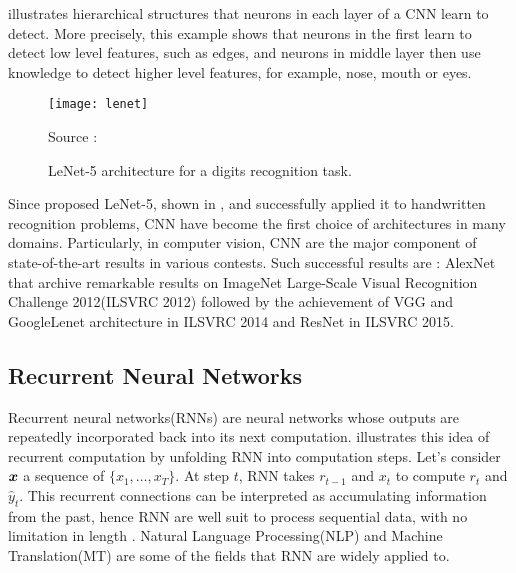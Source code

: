 \addfigure{\ref{fig:conv_intuition}} illustrates hierarchical structures that neurons in each layer of a CNN learn to detect. More precisely, this example shows that neurons in the first learn to detect low level features, such as edges, and neurons in middle layer then use knowledge to detect higher level features, for example, nose, mouth or eyes.


\begin{figure}[!hbt]
    \begin{center}
		\texttt{[image: lenet]}
		\caption{LeNet-5 architecture for a digits recognition task.}
		\label{fig:lenet}
		\small{ Source : \cite{LeCunGradientBasedLearningApplied2001} }
	\end{center}
\end{figure}


Since \cite{LeCunGradientBasedLearningApplied2001} proposed LeNet-5, shown in \addfigure{\ref{fig:lenet}}, and successfully applied it to handwritten recognition problems, CNN have become the first choice of architectures in many domains. Particularly, in computer vision, CNN are the major component of state-of-the-art results in various contests. Such successful results are :  AlexNet\cite{KrizhevskyImageNetClassificationDeep2012} that archive  remarkable results on  ImageNet Large-Scale Visual Recognition Challenge 2012(ILSVRC 2012) followed by the achievement of VGG\cite{SimonyanVeryDeepConvolutional2014} and GoogleLenet \cite{SzegedyGoingDeeperConvolutions2014} architecture in ILSVRC 2014 and ResNet\cite{HeDeepResidualLearning2015} in ILSVRC 2015.



\subsection{Recurrent Neural Networks}
Recurrent neural networks(RNNs) are neural networks whose outputs are repeatedly incorporated back into its next computation. \addfigure{\ref{fig:rnn_unfold}} illustrates this idea of recurrent computation by unfolding RNN into computation steps. Let's consider $\boldsymbol{x}$ a sequence of $\{ x_1, \dots, x_T \}$.  At step $t$, RNN takes $r_{t-1}$ and $x_{t}$ to compute $r_{t}$ and $\hat{y}_t$. This recurrent connections can be interpreted as accumulating information from the past, hence RNN are well suit to process sequential data, with no limitation in length . Natural Language Processing(NLP) and Machine Translation(MT) are some of the fields that RNN are widely applied to.


